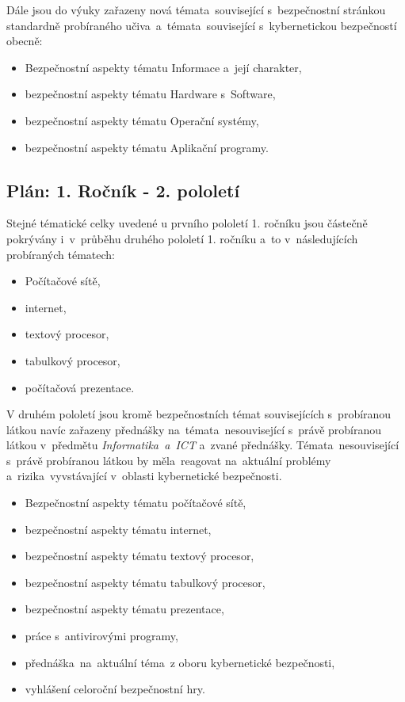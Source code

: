 \documentclass[a4paper, 12pt]{article}
\begin{document}
Dále jsou do výuky zařazeny nová témata~související s~bezpečnostní stránkou standardně probíraného učiva~a~témata~související s~kybernetickou bezpečností obecně:
\begin{itemize}
    \setlength{\itemsep}{-3pt}
    \item Bezpečnostní aspekty tématu Informace a~její charakter,
    \item bezpečnostní aspekty tématu Hardware s~Software,
    \item bezpečnostní aspekty tématu Operační systémy,
    \item bezpečnostní aspekty tématu Aplikační programy.
\end{itemize}

\subsection{Plán: 1. Ročník - 2. pololetí}
Stejné tématické celky uvedené u prvního pololetí 1. ročníku jsou částečně pokrývány i~v~průběhu druhého pololetí 1. ročníku a~to v~následujících probíraných tématech:
\begin{itemize}
    \setlength{\itemsep}{-3pt}
    \item Počítačové sítě,
    \item internet,
    \item textový procesor,
    \item tabulkový procesor,
    \item počítačová prezentace.
\end{itemize}

V druhém pololetí jsou kromě bezpečnostních témat souvisejících s~probíranou látkou navíc zařazeny přednášky na~témata~nesouvisející s~právě probíranou látkou v~předmětu \textit{Informatika~a~ICT} a~zvané přednášky. Témata~nesouvisející s~právě probíranou látkou by měla~reagovat na~aktuální problémy a~rizika~vyvstávající v~oblasti kybernetické bezpečnosti.

\begin{itemize}
    \setlength{\itemsep}{-3pt}
    \item Bezpečnostní aspekty tématu počítačové sítě,
    \item bezpečnostní aspekty tématu internet,
    \item bezpečnostní aspekty tématu textový procesor,
    \item bezpečnostní aspekty tématu tabulkový procesor,
    \item bezpečnostní aspekty tématu prezentace,
    \item práce s~antivirovými programy,
    \item přednáška~na~aktuální téma~z oboru kybernetické bezpečnosti,
    \item vyhlášení celoroční bezpečnostní hry.
\end{itemize}
\end{document}
